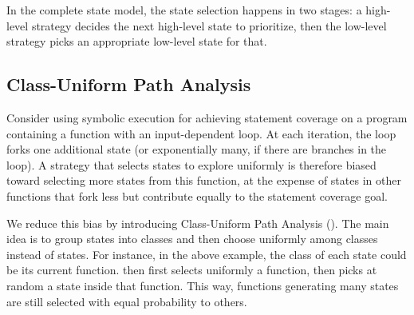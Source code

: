 In the complete state model, the state selection happens in two stages: a high-level strategy decides the next high-level state to prioritize, then the low-level strategy picks an appropriate low-level state for that.





\subsection{Class-Uniform Path Analysis}

Consider using symbolic execution for achieving statement coverage on a program containing a function with an input-dependent loop.  At each iteration, the loop forks one additional state (or exponentially many, if there are branches in the loop). A strategy that selects states to explore uniformly is therefore biased toward selecting more states from this function, at the expense of states in other functions that fork less but contribute equally to the statement coverage goal.

We reduce this bias by introducing Class-Uniform Path Analysis (\cupa).
%
The main idea is to group states into classes and then choose uniformly among classes instead of states.  For instance, in the above example, the class of each state could be its current function.  \cupa then first selects uniformly a function, then picks at random a state inside that function.  This way, functions generating many states are still selected with equal probability to others.

